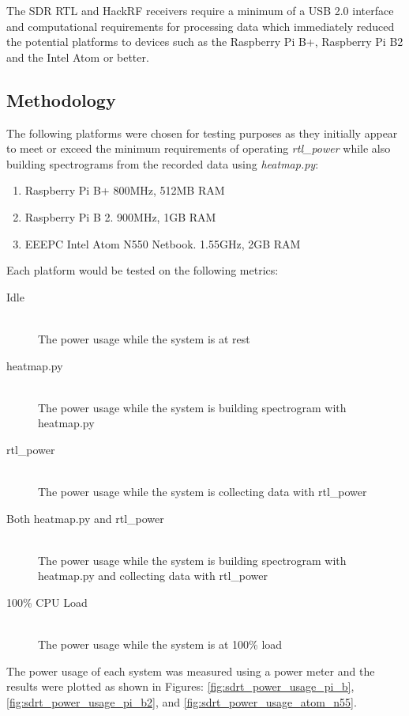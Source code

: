 The SDR RTL and HackRF receivers require a minimum of a USB 2.0 interface and computational requirements for processing data which immediately reduced the potential platforms to devices such as the Raspberry Pi B+, Raspberry Pi B2 and the Intel Atom or better.

\cite{bryce-11}

\subsection*{Methodology}
The following platforms were chosen for testing purposes as they initially appear to meet or exceed the minimum requirements of operating \textit{rtl\_power} while also building spectrograms from the recorded data using \textit{heatmap.py}:

\begin{enumerate}
	\item Raspberry Pi B+ 800MHz, 512MB RAM
	\item Raspberry Pi B 2. 900MHz, 1GB RAM
	\item EEEPC Intel Atom N550 Netbook. 1.55GHz, 2GB RAM
\end{enumerate}

Each platform would be tested on the following metrics:

\begin{description}
	\item [Idle] \hfil \\
	The power usage while the system is at rest
	\item [heatmap.py] \hfill \\ 
	The power usage while the system is building spectrogram with heatmap.py
	\item [rtl\_power] \hfill \\
	The power usage while the system is collecting data with rtl\_power
	\item [Both heatmap.py and rtl\_power] \hfill \\
	The power usage while the system is building spectrogram with heatmap.py and collecting data with rtl\_power
	\item [100\% CPU Load] \hfill \\
	The power usage while the system is at 100\% load
\end{description}


The power usage of each system was measured using a power meter and the results were plotted as shown in Figures: \ref{fig:sdrt_power_usage_pi_b}, \ref{fig:sdrt_power_usage_pi_b2}, and \ref{fig:sdrt_power_usage_atom_n55}.


